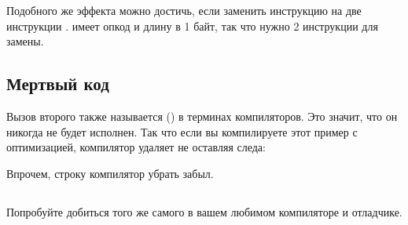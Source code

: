 

Подобного же эффекта можно достичь, если заменить инструкцию \JMP на две инструкции \NOP.
\NOP имеет опкод  и длину в 1 байт, так что нужно 2 инструкции для замены.

\subsection{Мертвый код}

Вызов второго \printf также называется  () 
в терминах компиляторов.
Это значит, что он никогда не будет исполнен.
Так что если вы компилируете этот пример с оптимизацией, компилятор удаляет  не оставляя следа:



Впрочем, строку  компилятор убрать забыл.


\subsection{\Exercise}

Попробуйте добиться того же самого в вашем любимом компиляторе и отладчике.

